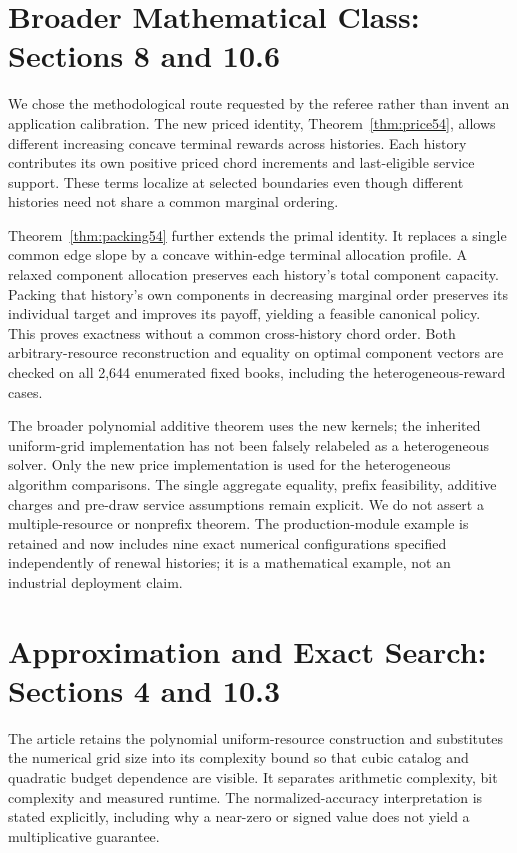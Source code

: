 \section{Broader Mathematical Class: Sections 8 and 10.6}
We chose the methodological route requested by the referee rather than invent an application calibration. The new priced identity, Theorem~\ref{thm:price54}, allows different increasing concave terminal rewards across histories. Each history contributes its own positive priced chord increments and last-eligible service support. These terms localize at selected boundaries even though different histories need not share a common marginal ordering.

Theorem~\ref{thm:packing54} further extends the primal identity. It replaces a single common edge slope by a concave within-edge terminal allocation profile. A relaxed component allocation preserves each history's total component capacity. Packing that history's own components in decreasing marginal order preserves its individual target and improves its payoff, yielding a feasible canonical policy. This proves exactness without a common cross-history chord order. Both arbitrary-resource reconstruction and equality on optimal component vectors are checked on all 2,644 enumerated fixed books, including the heterogeneous-reward cases.

The broader polynomial additive theorem uses the new kernels; the inherited uniform-grid implementation has not been falsely relabeled as a heterogeneous solver. Only the new price implementation is used for the heterogeneous algorithm comparisons. The single aggregate equality, prefix feasibility, additive charges and pre-draw service assumptions remain explicit. We do not assert a multiple-resource or nonprefix theorem. The production-module example is retained and now includes nine exact numerical configurations specified independently of renewal histories; it is a mathematical example, not an industrial deployment claim.

\section{Approximation and Exact Search: Sections 4 and 10.3}
The article retains the polynomial uniform-resource construction and substitutes the numerical grid size into its complexity bound so that cubic catalog and quadratic budget dependence are visible. It separates arithmetic complexity, bit complexity and measured runtime. The normalized-accuracy interpretation is stated explicitly, including why a near-zero or signed value does not yield a multiplicative guarantee.

